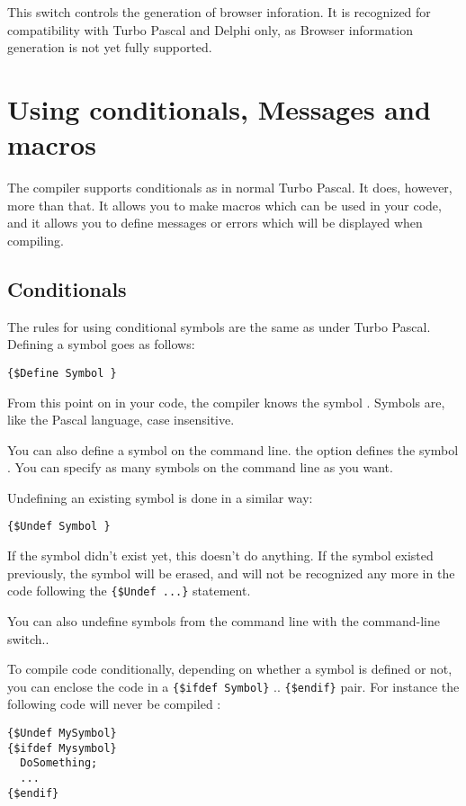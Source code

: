 \documentclass{report}
\begin{document}
This switch controls the generation of browser inforation. It is recognized
for compatibility with Turbo Pascal and Delphi only, as Browser information
generation is not yet fully supported.


\chapter{Using conditionals, Messages and macros}
\label{ch:CondMessageMacro}
The \fpc compiler supports conditionals as in normal Turbo Pascal. It does,
however, more than that. It allows you to make macros which can be used in
your code, and it allows you to define messages or errors which will be
displayed when compiling.

\section{Conditionals}
\label{se:Conditionals}
The rules for using conditional symbols are the same as under Turbo Pascal.
Defining a symbol goes as follows:
\begin{verbatim}
{$Define Symbol }
\end{verbatim}
From this point on in your code, the compiler knows the symbol .
Symbols are, like the Pascal language, case insensitive.

You can also define a symbol on the command line. the  option
defines the symbol . You can specify as many symbols on the
command line as you want.

Undefining an existing symbol is done in a similar way:
\begin{verbatim}
{$Undef Symbol }
\end{verbatim}
If the symbol didn't exist yet, this doesn't do anything. If the symbol
existed previously, the symbol will be erased, and will not be recognized
any more in the code following the \verb|{$Undef ...}| statement.

You can also undefine symbols from the command line with the 
command-line switch..

To compile code conditionally, depending on whether a symbol is defined or
not, you can enclose the code in a \verb|{$ifdef Symbol}| .. \verb|{$endif}|
pair. For instance the following code will never be compiled :
\begin{verbatim}
{$Undef MySymbol}
{$ifdef Mysymbol}
  DoSomething;
  ...
{$endif}
\end{verbatim}
\end{document}
